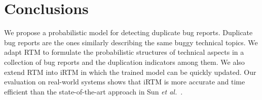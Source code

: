 \section{Conclusions}

We propose a probabilistic model for detecting duplicate bug
reports. 
Duplicate bug reports are the ones similarly describing the same buggy
technical topics. We adapt RTM to formulate the probabilistic
structures of technical aspects in a collection of bug reports and the
duplication indicators among them.
We also extend RTM into iRTM in which the trained model can be quickly
updated. Our evaluation on real-world systems shows that iRTM is more
accurate and time efficient than the state-of-the-art approach in Sun
{\em et al.}~\cite{davidlo10}.

